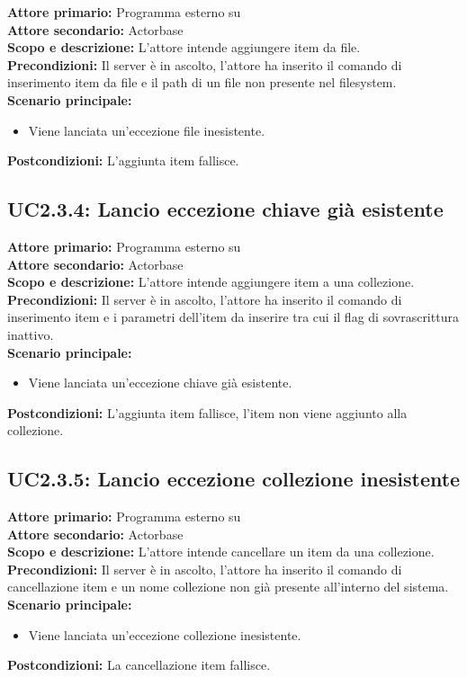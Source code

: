 \documentclass{scalatekids-article}
\begin{document}
\textbf{Attore primario:} Programma esterno su \\
\textbf{Attore secondario:} Actorbase\\
\textbf{Scopo e descrizione:}
L'attore intende aggiungere item da file.\\
\textbf{Precondizioni:} Il server è in ascolto, l'attore ha inserito il comando di inserimento item da file e il path di un file non presente nel filesystem.\\
\textbf{Scenario principale:}
\begin{itemize}
\item Viene lanciata un'eccezione file inesistente.
\end{itemize}
\textbf{Postcondizioni:} L'aggiunta item fallisce.

\subsection{UC2.3.4: Lancio eccezione chiave già esistente}

\textbf{Attore primario:} Programma esterno su \\
\textbf{Attore secondario:} Actorbase\\
\textbf{Scopo e descrizione:}
L'attore intende aggiungere item a una collezione.\\
\textbf{Precondizioni:} Il server è in ascolto, l'attore ha inserito il comando di inserimento item e i parametri dell'item da inserire tra cui il flag di sovrascrittura inattivo.\\
\textbf{Scenario principale:}
\begin{itemize}
\item Viene lanciata un'eccezione chiave già esistente.
\end{itemize}
\textbf{Postcondizioni:} L'aggiunta item fallisce, l'item non viene aggiunto alla collezione.

\subsection{UC2.3.5: Lancio eccezione collezione inesistente}

\textbf{Attore primario:} Programma esterno su \\
\textbf{Attore secondario:} Actorbase\\
\textbf{Scopo e descrizione:}
L'attore intende cancellare un item da una collezione.\\
\textbf{Precondizioni:} Il server è in ascolto, l'attore ha inserito il comando di cancellazione item e un nome collezione non già presente all'interno del sistema.\\
\textbf{Scenario principale:}
\begin{itemize}
\item Viene lanciata un'eccezione collezione inesistente.
\end{itemize}
\textbf{Postcondizioni:} La cancellazione item fallisce.
\end{document}
